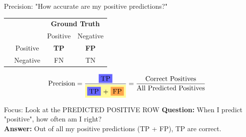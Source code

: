 \documentclass[dvipsnames]{beamer}
\begin{document}
\begin{frame}{Precision: "How accurate are my positive predictions?"}
\vspace{2pt}
\begin{center}
\begin{tabular}{@{}cc cc@{}}
	\multicolumn{1}{c}{} &\multicolumn{1}{c}{} &\multicolumn{2}{c}{\textbf{Ground Truth}} \\ 
	\cmidrule(lr){3-4}
	\multicolumn{1}{c}{} & 
	\multicolumn{1}{c}{} & 
	\multicolumn{1}{c}{Positive} & 
	\multicolumn{1}{c}{Negative} \\ 
	\cline{2-4}
	\multirow[c]{2}{*}{\rotatebox[origin=tr]{90}{\textbf{Predicted}}}
	& \colorbox{yellow!40}{Positive}  & \cellcolor{blue!60}\textbf{TP} & \cellcolor{orange!70}\textbf{FP}   \\[1.2ex]
	& Negative  & \cellcolor{gray!30}FN   & \cellcolor{gray!30}TN \\ 
	\cline{2-4}
\end{tabular}
\end{center}
\vspace{6pt}
$$\text{Precision} = \frac{\colorbox{blue!60}{\text{TP}}}{\colorbox{yellow!40}{\colorbox{blue!60}{\text{TP}} + \colorbox{orange!70}{\text{FP}}}} = \frac{\text{Correct Positives}}{\text{All Predicted Positives}}$$
\pause
\vspace{-0.3em}
\begin{alertblock}{Focus: Look at the PREDICTED POSITIVE ROW}
\textbf{Question:} When I predict "positive", how often am I right?\\
\textbf{Answer:} Out of all my positive predictions (TP + FP), TP are correct.
\end{alertblock}
\end{frame}
\end{document}
